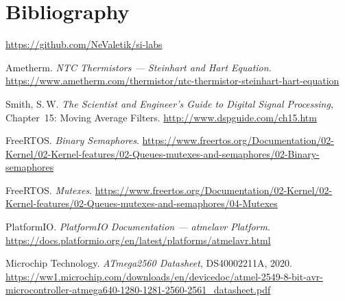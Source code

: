 \documentclass[12pt]{article}
\begin{document}
\section{Bibliography}

\begingroup
\makeatletter
\renewcommand{\section}[2]{}
\makeatother

\begin{thebibliography}{}

  \url{https://github.com/NeValetik/si-labs}

  Ametherm. \textit{NTC Thermistors --- Steinhart and Hart Equation}.
  \url{https://www.ametherm.com/thermistor/ntc-thermistor-steinhart-hart-equation}

  Smith, S.\,W. \textit{The Scientist and Engineer's Guide to Digital Signal Processing}, Chapter~15: Moving Average Filters.
  \url{http://www.dspguide.com/ch15.htm}

  FreeRTOS. \textit{Binary Semaphores}.
  \url{https://www.freertos.org/Documentation/02-Kernel/02-Kernel-features/02-Queues-mutexes-and-semaphores/02-Binary-semaphores}

  FreeRTOS. \textit{Mutexes}.
  \url{https://www.freertos.org/Documentation/02-Kernel/02-Kernel-features/02-Queues-mutexes-and-semaphores/04-Mutexes}

  PlatformIO. \textit{PlatformIO Documentation --- atmelavr Platform}.
  \url{https://docs.platformio.org/en/latest/platforms/atmelavr.html}

  Microchip Technology. \textit{ATmega2560 Datasheet}, DS40002211A, 2020.
  \url{https://ww1.microchip.com/downloads/en/devicedoc/atmel-2549-8-bit-avr-microcontroller-atmega640-1280-1281-2560-2561_datasheet.pdf}

\end{thebibliography}
\endgroup

\pagebreak
\end{document}
